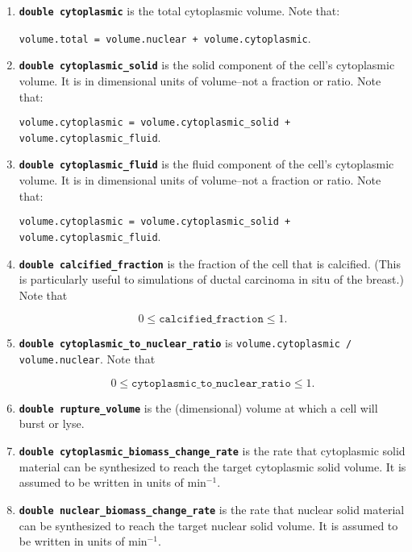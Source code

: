 \documentclass[12pt]{article}
\newcommand{\beq}{\begin{equation}}
\newcommand{\eeq}{\end{equation}}
\renewcommand{\v}{\verb}
\newcommand{\smallcode}[1]{\textbf{\texttt{#1}}}
\begin{document}
\begin{enumerate}
\item 
\smallcode{double cytoplasmic} is the total cytoplasmic volume. Note that: 

\v|volume.total = volume.nuclear + volume.cytoplasmic|. 

\item 
\smallcode{double cytoplasmic\_solid} is the solid component of the cell's cytoplasmic volume. It is in dimensional units 
of volume--not a fraction or ratio. Note that: 

\v|volume.cytoplasmic = volume.cytoplasmic_solid + volume.cytoplasmic_fluid|.

\item 
\smallcode{double cytoplasmic\_fluid} is the fluid component of the cell's cytoplasmic volume. It is in dimensional units 
of volume--not a fraction or ratio. Note that: 

\v|volume.cytoplasmic = volume.cytoplasmic_solid + volume.cytoplasmic_fluid|.

\item 
\smallcode{double calcified\_fraction} is the fraction of the cell that is calcified. (This is particularly useful to simulations 
of ductal carcinoma in situ of the breast.) Note that 

\beq
0 \le \texttt{calcified\_fraction} \le 1.
\eeq
     
\item 
\smallcode{double cytoplasmic\_to\_nuclear\_ratio} is \v|volume.cytoplasmic / volume.nuclear|. Note that 

\beq
0 \le \texttt{cytoplasmic\_to\_nuclear\_ratio} \le 1.
\eeq

\item 
\smallcode{double rupture\_volume} is the (dimensional) volume at which a cell will burst or lyse.  


\item 
\smallcode{double cytoplasmic\_biomass\_change\_rate} is the rate that cytoplasmic solid material can be synthesized to reach 
the target cytoplasmic solid volume. It is assumed to be written in units of $\textrm{min}^{-1}$.

\item 
\smallcode{double nuclear\_biomass\_change\_rate} is the rate that nuclear solid material can be synthesized to reach 
the target nuclear solid volume. It is assumed to be written in units of $\textrm{min}^{-1}$.


\end{enumerate}
\end{document}
